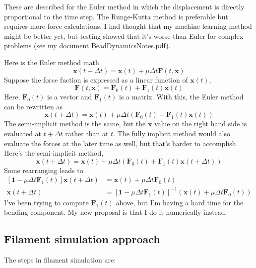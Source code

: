 \documentclass {scrbook}
\begin{document}
These are described for the Euler method in which the displacement is directly proportional to the time step. The Runge-Kutta method is preferable but requires more force calculations. I had thought that my machine learning method might be better yet, but testing showed that it's worse than Euler for complex problems (see my document BeadDynamicsNotes.pdf).

Here is the Euler method math
$$\bm{x}(t+\Delta t) = \bm{x}(t) + \mu \Delta t \bm{F}(t,\bm{x})$$
Suppose the force fuction is expressed as a linear function of $\bm{x}(t)$,
$$\bm{F}(t,\bm{x}) = \bm{F}_0(t) + \bm{F}_1(t) \bm{x}(t)$$
Here, $\bm{F}_0(t)$ is a vector and $\bm{F}_1(t)$ is a matrix. With this, the Euler method can be rewritten as
$$\bm{x}(t+\Delta t) = \bm{x}(t) + \mu \Delta t (\bm{F}_0(t) + \bm{F}_1(t) \bm{x}(t))$$
The semi-implicit method is the same, but the $\bm{x}$ value on the right hand side is evaluated at $t+\Delta t$ rather than at $t$. The fully implicit method would also evaluate the forces at the later time as well, but that's harder to accomplish. Here's the semi-implicit method,
$$\bm{x}(t+\Delta t) = \bm{x}(t) + \mu \Delta t (\bm{F}_0(t) + \bm{F}_1(t) \bm{x}(t+\Delta t))$$
Some rearranging leads to
\begin{align*}
\left[ \bm{1} - \mu \Delta t \bm{F}_1(t)\right]\bm{x}(t+\Delta t) &= \bm{x}(t) + \mu \Delta t \bm{F}_0(t) \\
\bm{x}(t+\Delta t) &= \left[ \bm{1} - \mu \Delta t \bm{F}_1(t)\right]^{-1} (\bm{x}(t) + \mu \Delta t \bm{F}_0(t))
\end{align*}
I've been trying to compute $\bm{F}_1(t)$ above, but I'm having a hard time for the bending component. My new proposal is that I do it numerically instead. 


\subsection{Filament simulation approach}
\label{sect:FilamentSimulationApproach}

The steps in filament simulation are:
\end{document}

